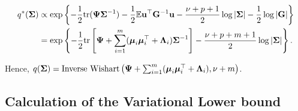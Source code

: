 \documentclass[11pt]{amsart}
\begin{document}
\begin{align*}
	q^*({\boldsymbol \Sigma}) & \propto \exp \left \{ -\frac{1}{2} \text{tr} ({\boldsymbol \Psi} {\boldsymbol \Sigma}^{-1}) - \frac{1}{2} \mathbb{E} {\bf u}^\top {\bf G}^{-1} {\bf u}               
	- \frac{\nu + p + 1}{2} \log |{\boldsymbol \Sigma}| - \frac{1}{2} \log |{\bf G}| \right \} \\
	             & =\exp \left \{ -\frac{1}{2} \text{tr} \left[{\boldsymbol \Psi} + \sum_{i=1}^m ({\boldsymbol \mu}_i {\boldsymbol \mu}_i^\top + {\boldsymbol \Lambda}_i) {\boldsymbol \Sigma}^{-1}\right] 
	- \frac{\nu + p + m + 1}{2} \log |{\boldsymbol \Sigma}| \right \}.
\end{align*}

Hence, $q({\boldsymbol \Sigma}) = \text{Inverse Wishart} \left( {\boldsymbol \Psi} + \sum_{i=1}^m ({\boldsymbol \mu}_i {\boldsymbol \mu}_i^\top + {\boldsymbol \Lambda}_i), \nu + m \right)$.


\subsection{Calculation of the Variational Lower bound}
	
\end{document}
